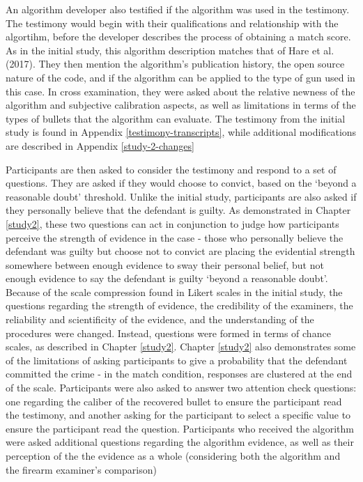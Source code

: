\documentclass[print]{nuthesis}
\begin{document}
An algorithm developer also testified if the algorithm was used in the testimony.
The testimony would begin with their qualifications and relationship with the algortihm, before the developer describes the process of obtaining a match score.
As in the initial study, this algorithm description matches that of Hare et al. (2017).
They then mention the algorithm's publication history, the open source nature of the code, and if the algorithm can be applied to the type of gun used in this case.
In cross examination, they were asked about the relative newness of the algorithm and subjective calibration aspects, as well as limitations in terms of the types of bullets that the algorithm can evaluate.
The testimony from the initial study is found in Appendix \ref{testimony-transcripts}, while additional modifications are described in Appendix \ref{study-2-changes}

Participants are then asked to consider the testimony and respond to a set of questions.
They are asked if they would choose to convict, based on the `beyond a reasonable doubt' threshold.
Unlike the initial study, participants are also asked if they personally believe that the defendant is guilty.
As demonstrated in Chapter \ref{study2}, these two questions can act in conjunction to judge how participants perceive the strength of evidence in the case - those who personally believe the defendant was guilty but choose not to convict are placing the evidential strength somewhere between enough evidence to sway their personal belief, but not enough evidence to say the defendant is guilty `beyond a reasonable doubt'.
Because of the scale compression found in Likert scales in the initial study, the questions regarding the strength of evidence, the credibility of the examiners, the reliability and scientificity of the evidence, and the understanding of the procedures were changed.
Instead, questions were formed in terms of chance scales, as described in Chapter \ref{study2}.
Chapter \ref{study2} also demonstrates some of the limitations of asking participants to give a probability that the defendant committed the crime - in the match condition, responses are clustered at the end of the scale.
Participants were also asked to answer two attention check questions: one regarding the caliber of the recovered bullet to ensure the participant read the testimony, and another asking for the participant to select a specific value to ensure the participant read the question.
Participants who received the algorithm were asked additional questions regarding the algorithm evidence, as well as their perception of the the evidence as a whole (considering both the algorithm and the firearm examiner's comparison)
\end{document}
